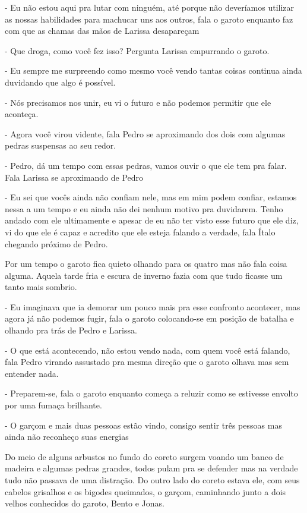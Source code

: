 - Eu não estou aqui pra lutar com ninguém, até porque não deveríamos utilizar as nossas habilidades para machucar uns aos outros, fala o garoto enquanto faz com que as chamas das mãos de Larissa desapareçam

- Que droga, como você fez isso? Pergunta Larissa empurrando o garoto.

- Eu sempre me surpreendo como mesmo você vendo tantas coisas continua ainda duvidando que algo é possível.

- Nós precisamos nos unir, eu vi o futuro e não podemos permitir que ele aconteça. 

- Agora você virou vidente, fala Pedro se aproximando dos dois com algumas pedras suspensas ao seu redor.

- Pedro, dá um tempo com essas pedras, vamos ouvir o que ele tem pra falar. Fala Larissa se aproximando de Pedro

- Eu sei que vocês ainda não confiam nele, mas em mim podem confiar, estamos nessa a um tempo e eu ainda não dei nenhum motivo pra duvidarem. Tenho andado com ele ultimamente e apesar de eu não ter visto esse futuro que ele diz, vi do que ele é capaz e acredito que ele esteja falando a verdade, fala Ítalo chegando próximo de Pedro.

Por um tempo o garoto fica quieto olhando para os quatro mas não fala coisa alguma. Aquela tarde fria e escura de inverno fazia com que tudo ficasse um tanto mais sombrio.

- Eu imaginava que ia demorar um pouco mais pra esse confronto acontecer, mas agora já não podemos fugir, fala o garoto colocando-se em posição de batalha e olhando pra trás de Pedro e Larissa.

- O que está acontecendo, não estou vendo nada, com quem você está falando, fala Pedro virando assustado pra mesma direção que o garoto olhava mas sem entender nada.

- Preparem-se, fala o garoto enquanto começa a reluzir como se estivesse envolto por uma fumaça brilhante.

- O garçom e mais duas pessoas estão vindo, consigo sentir três pessoas mas ainda não reconheço suas energias

Do meio de alguns arbustos no fundo do coreto surgem voando um banco de madeira e algumas pedras grandes, todos pulam pra se defender mas na verdade tudo não passava de uma distração. Do outro lado do coreto estava ele, com seus cabelos grisalhos e os bigodes queimados, o garçom, caminhando junto a dois velhos conhecidos do garoto, Bento e Jonas. 

